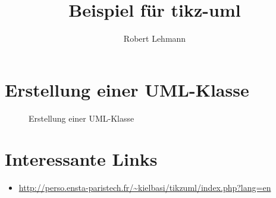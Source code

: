 \documentclass[12pt, a4paper]{scrartcl}
\title{Beispiel für tikz-uml}
\author{Robert Lehmann}
\begin{document}
\maketitle
\tableofcontents
\listoffigures

\section{Erstellung einer UML-Klasse}
\begin{figure}[htb]
  \centering
\caption{Erstellung einer UML-Klasse}
\end{figure}

\section{Interessante Links}
\begin{itemize}
  \item \url{http://perso.ensta-paristech.fr/~kielbasi/tikzuml/index.php?lang=en}
\end{itemize}
\end{document}
